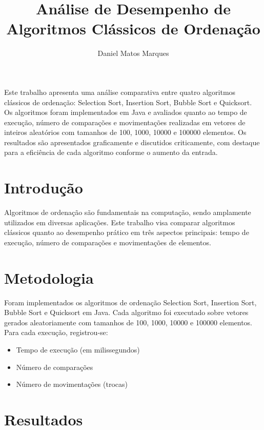 \documentclass[12pt]{article}
\title{Análise de Desempenho de Algoritmos Clássicos de Ordenação}
\author{Daniel Matos Marques}
\begin{document}
 

\maketitle

\begin{resumo}
Este trabalho apresenta uma análise comparativa entre quatro algoritmos clássicos de ordenação: Selection Sort, Insertion Sort, Bubble Sort e Quicksort. Os algoritmos foram implementados em Java e avaliados quanto ao tempo de execução, número de comparações e movimentações realizadas em vetores de inteiros aleatórios com tamanhos de 100, 1000, 10000 e 100000 elementos. Os resultados são apresentados graficamente e discutidos criticamente, com destaque para a eficiência de cada algoritmo conforme o aumento da entrada.
\end{resumo}

\section{Introdução}

Algoritmos de ordenação são fundamentais na computação, sendo amplamente utilizados em diversas aplicações. Este trabalho visa comparar algoritmos clássicos quanto ao desempenho prático em três aspectos principais: tempo de execução, número de comparações e movimentações de elementos.

\section{Metodologia}

Foram implementados os algoritmos de ordenação Selection Sort, Insertion Sort, Bubble Sort e Quicksort em Java. Cada algoritmo foi executado sobre vetores gerados aleatoriamente com tamanhos de 100, 1000, 10000 e 100000 elementos. Para cada execução, registrou-se:
\begin{itemize}
  \item Tempo de execução (em milissegundos)
  \item Número de comparações
  \item Número de movimentações (trocas)
\end{itemize}

\newpage

\section{Resultados}
\end{document}

